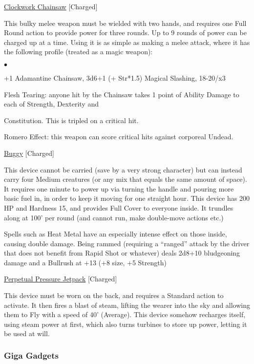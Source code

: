 \medskip\noindent\underline{Clockwork Chainsaw} [Charged] 

\noindent This bulky melee weapon must be wielded with two hands, and requires one Full Round action to provide power for three rounds. Up to 9 rounds of power can be charged up at a time. Using it is as simple as making a melee attack, where it has the following profile (treated as a magic weapon): 

\begin{list}{$\bullet$}{\itemspace}
\item +1 Adamantine Chainsaw, 3d6+1 (+ Str*1.5) Magical Slashing, 18-20/x3 
\item Flesh Tearing: anyone hit by the Chainsaw takes 1 point of Ability Damage to each of Strength, Dexterity and \item Constitution. This is tripled on a critical hit. 
\item Romero Effect: this weapon can score critical hits against corporeal Undead. 
\end{list}

\medskip\noindent\underline{Buggy} [Charged] 

\noindent This device cannot be carried (save by a very strong character) but can instead carry four Medium creatures (or any mix that equals the same amount of space). It requires one minute to power up via turning the handle and pouring more basic fuel in, in order to keep it moving for one straight hour. This device has 200 HP and Hardness 15, and provides Full Cover to everyone inside. It trundles along at 100' per round (and cannot run, make double-move actions etc.) 

\smallskip\noindent Spells such as Heat Metal have an especially intense effect on those inside, causing double damage. Being rammed (requiring a ``ranged'' attack by the driver that does not benefit from Rapid Shot or whatever) deals 2d8+10 bludgeoning damage and a Bullrush at +13 (+8 size, +5 Strength) 

\medskip\noindent\underline{Perpetual Pressure Jetpack} [Charged] 

\noindent This device must be worn on the back, and requires a Standard action to activate. It then fires a blast of steam, lifting the wearer into the sky and allowing them to Fly with a speed of 40' (Average). This device somehow recharges itself, using steam power at first, which also turns turbines to store up power, letting it be used at will. 

\subsubsection{Giga Gadgets}

